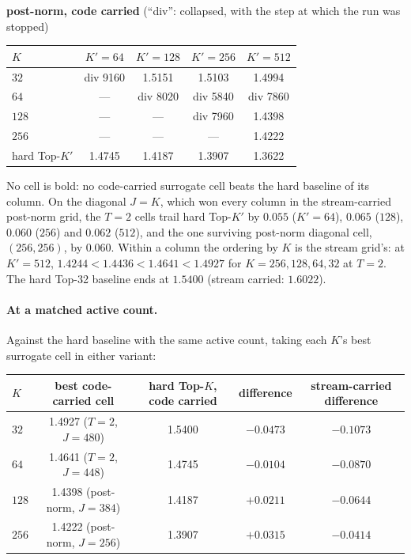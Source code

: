 \documentclass[11pt,a4paper]{article}
\newcommand{\Kp}{K'}
\begin{document}
\begin{center}\small
\textbf{post-norm, code carried} (``div'': collapsed, with the step at which the run was stopped)\\[2pt]
\begin{tabular}{lcccc}
\toprule
$K$ & $\Kp{=}64$ & $\Kp{=}128$ & $\Kp{=}256$ & $\Kp{=}512$ \\
\midrule
$32$   & div 9160 & 1.5151   & 1.5103   & 1.4994 \\
$64$   & ---      & div 8020 & div 5840 & div 7860 \\
$128$  & ---      & ---      & div 7960 & 1.4398 \\
$256$  & ---      & ---      & ---      & 1.4222 \\
\midrule
hard Top-$\Kp$ & 1.4745 & 1.4187 & 1.3907 & 1.3622 \\
\bottomrule
\end{tabular}
\end{center}

No cell is bold: no code-carried surrogate cell beats the hard baseline of
its column. On the diagonal $J = K$, which won every column in the
stream-carried post-norm grid, the $T=2$ cells trail hard Top-$\Kp$ by
$0.055$ ($\Kp=64$), $0.065$ ($128$), $0.060$ ($256$) and $0.062$ ($512$), and
the one surviving post-norm diagonal cell, $(256,256)$, by $0.060$. Within a
column the ordering by $K$ is the stream grid's: at $\Kp = 512$,
$1.4244 < 1.4436 < 1.4641 < 1.4927$ for $K = 256, 128, 64, 32$ at $T=2$. The
hard Top-32 baseline ends at $1.5400$ (stream carried: $1.6022$).

\paragraph{At a matched active count.}
Against the hard baseline with the same active count, taking each $K$'s best
surrogate cell in either variant:

\begin{center}\small
\begin{tabular}{lcccc}
\toprule
$K$ & best code-carried cell & hard Top-$K$, code carried & difference & stream-carried difference \\
\midrule
$32$  & 1.4927 ($T{=}2$, $J{=}480$)      & 1.5400 & $-0.0473$ & $-0.1073$ \\
$64$  & 1.4641 ($T{=}2$, $J{=}448$)      & 1.4745 & $-0.0104$ & $-0.0870$ \\
$128$ & 1.4398 (post-norm, $J{=}384$)    & 1.4187 & $+0.0211$ & $-0.0644$ \\
$256$ & 1.4222 (post-norm, $J{=}256$)    & 1.3907 & $+0.0315$ & $-0.0414$ \\
\bottomrule
\end{tabular}
\end{center}
\end{document}
